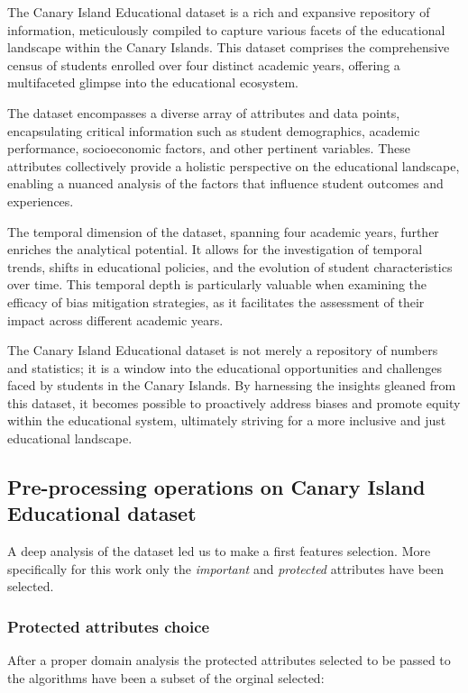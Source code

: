The Canary Island Educational dataset is a rich and expansive repository of information, meticulously compiled to capture various facets of the educational landscape within the Canary Islands. This dataset comprises the comprehensive census of students enrolled over four distinct academic years, offering a multifaceted glimpse into the educational ecosystem. 

The dataset encompasses a diverse array of attributes and data points, encapsulating critical information such as student demographics, academic performance, socioeconomic factors, and other pertinent variables. These attributes collectively provide a holistic perspective on the educational landscape, enabling a nuanced analysis of the factors that influence student outcomes and experiences. 

The temporal dimension of the dataset, spanning four academic years, further enriches the analytical potential. It allows for the investigation of temporal trends, shifts in educational policies, and the evolution of student characteristics over time. This temporal depth is particularly valuable when examining the efficacy of bias mitigation strategies, as it facilitates the assessment of their impact across different academic years. 

The Canary Island Educational dataset is not merely a repository of numbers and statistics; it is a window into the educational opportunities and challenges faced by students in the Canary Islands. By harnessing the insights gleaned from this dataset, it becomes possible to proactively address biases and promote equity within the educational system, ultimately striving for a more inclusive and just educational landscape.

\subsection{Pre-processing operations on Canary Island Educational dataset}

A deep analysis of the dataset led us to make a first features selection. More specifically for this work only the \emph{important} and \emph{protected} attributes have been selected.

\subsubsection{Protected attributes choice}

After a proper domain analysis the protected attributes selected to be passed to the algorithms have been a subset of the orginal selected:

